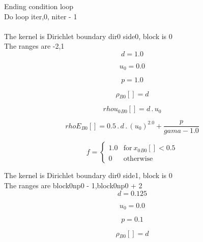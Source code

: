 \documentclass{article}
\begin{document}
\noindent Ending condition loop %
\\\noindent Do loop iter,0, niter - 1\\
\\\noindent The kernel is Dirichlet boundary dir0 side0, block is 0\\\noindent The ranges are -2,1\\\begin{dmath}d = 1.0\end{dmath}

\begin{dmath}u_{0} = 0.0\end{dmath}

\begin{dmath}p = 1.0\end{dmath}

\begin{dmath}{\rho{_{B0}}}[{}] = d\end{dmath}

\begin{dmath}{rhou_{0}{_{B0}}}[{}] = d \,.\, u_{0}\end{dmath}

\begin{dmath}{rhoE{_{B0}}}[{}] = 0.5 \,.\, d \,.\, \left(u_{0} \right)^{2.0} + \frac{p}{gama - 1.0}\end{dmath}

\begin{dmath}f = \begin{cases} 1.0 & \text{for}\: {x_{0}{_{B0}}}[{}] < 0.5 \\0 & \text{otherwise} \end{cases}\end{dmath}

\noindent The kernel is Dirichlet boundary dir0 side1, block is 0\\\noindent The ranges are block0np0 - 1,block0np0 + 2\\\begin{dmath}d = 0.125\end{dmath}

\begin{dmath}u_{0} = 0.0\end{dmath}

\begin{dmath}p = 0.1\end{dmath}

\begin{dmath}{\rho{_{B0}}}[{}] = d\end{dmath}
\end{document}
